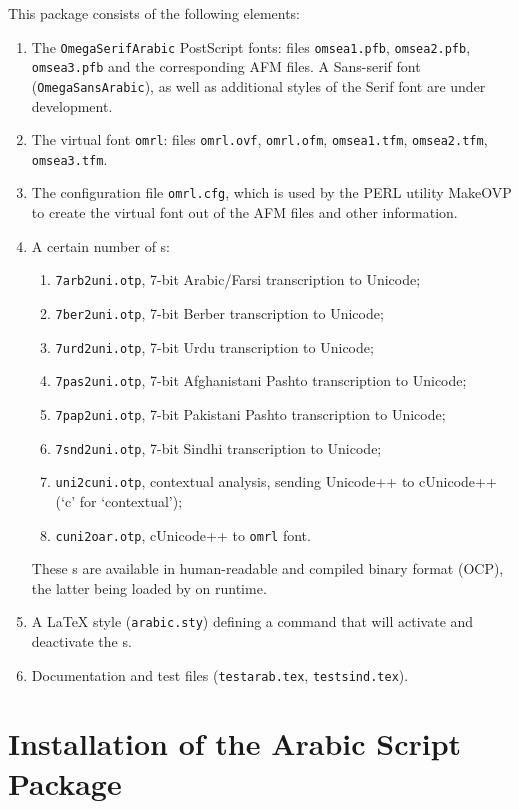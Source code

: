 \documentclass[a4paper,11pt]{article}
\begin{document}
This package consists of the following elements:

\begin{enumerate}
\item{} The \texttt{OmegaSerifArabic} PostScript fonts:
files \texttt{omsea1.pfb}, \texttt{omsea2.pfb}, \texttt{omsea3.pfb}
and the corresponding AFM files. A Sans-serif font
(\texttt{Omega\-Sans\-Arabic}), as well as additional styles of the
Serif font are under development.
\item{} The virtual font \texttt{omrl}: files
\texttt{omrl.ovf}, \texttt{omrl.ofm}, \texttt{omsea1.tfm},
\texttt{omsea2.tfm}, \texttt{omsea3.tfm}.
\item{} The configuration file \texttt{omrl.cfg}, which is used by the
PERL utility MakeOVP to create the virtual font out of the AFM files
and other information.
\item{} A certain number of \OTP{}s: 
\begin{enumerate}
\item{} \texttt{7arb2uni.otp}, 7-bit Arabic/Farsi transcription to Unicode;
\item{} \texttt{7ber2uni.otp}, 7-bit Berber transcription to Unicode;
\item{} \texttt{7urd2uni.otp}, 7-bit Urdu transcription to Unicode;
\item{} \texttt{7pas2uni.otp}, 7-bit Afghanistani Pashto transcription to Unicode;
\item{} \texttt{7pap2uni.otp}, 7-bit Pakistani Pashto transcription to Unicode;
\item{} \texttt{7snd2uni.otp}, 7-bit Sindhi transcription to Unicode;
\item{} \texttt{uni2cuni.otp}, contextual analysis, sending Unicode++ to cUnicode++
(`c' for `contextual');
\item{} \texttt{cuni2oar.otp}, cUnicode++ to \texttt{omrl} font.
\end{enumerate}
These \OTP{}s are available in human-readable and compiled binary
format (OCP), the latter being loaded by \OMEGA{} on runtime.
\item{} A \LaTeX{} style (\texttt{arabic.sty}) defining a command that
will activate and deactivate the \OTP{}s.
\item{} Documentation and test files (\texttt{testarab.tex},
\texttt{testsind.tex}).
\end{enumerate}

\section{Installation of the \OMEGA{} Arabic Script Package}
\end{document}
